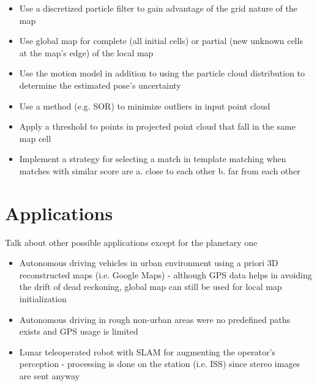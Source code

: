 \begin{itemize}
    \item Use a discretized particle filter to gain advantage of the grid nature of the map
    \item Use global map for complete (all initial cells) or partial (new unknown cells at the map's edge) of the local map
    \item Use the motion model in addition to using the particle cloud distribution to determine the estimated pose's uncertainty
    \item Use a method (e.g. SOR) to minimize outliers in input point cloud
    \item Apply a threshold to points in projected point cloud that fall in the same map cell
    \item Implement a strategy for selecting a match in template matching when matches with similar score are a. close to each other b. far from each other
\end{itemize}

\section{Applications}

Talk about other possible applications except for the planetary one

\begin{itemize}
    \item Autonomous driving vehicles in urban environment using a priori 3D reconstructed maps (i.e. Google Maps) - although GPS data helps in avoiding the drift of dead reckoning, global map can still be used for local map initialization
    \item Autonomous driving in rough non-urban areas were no predefined paths exists and GPS usage is limited
    \item Lunar teleoperated robot with SLAM for augmenting the operator's perception - processing is done on the station (i.e. ISS) since stereo images are sent anyway
\end{itemize}


